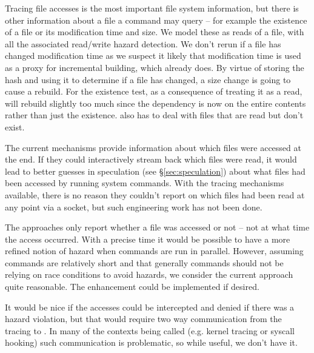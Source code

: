 Tracing file accesses is the most important file system information, but there is other information about a file a command may query -- for example the existence of a file or its modification time and size. We model these as reads of a file, with all the associated read/write hazard detection. %
We don't rerun if a file has changed modification time as we suspect it likely that modification time is used as a proxy for incremental building, which \Rattle already does. By virtue of \Rattle storing the hash and using it to determine if a file has changed, a size change is going to cause a rebuild. For the existence test, as a consequence of treating it as a read, \Rattle will rebuild slightly too much since the dependency is now on the entire contents rather than just the existence.  \Rattle also has to deal with files that are read but don't exist.



The current mechanisms provide information about which files were accessed at the end. If they could interactively stream back which files were read, it would lead to better guesses in speculation (see \S\ref{sec:speculation}) about what files had been accessed by running system commands. With the tracing mechanisms available, there is no reason they couldn't report on which files had been read at any point via a socket, but such engineering work has not been done.

The approaches only report whether a file was accessed or not -- not at what time the access occurred. With a precise time it would be possible to have a more refined notion of hazard when commands are run in parallel. However, assuming commands are relatively short and that generally commands should not be relying on race conditions to avoid hazards, we consider the current approach quite reasonable. The enhancement could be implemented if desired.

It would be nice if the accesses could be intercepted and denied if there was a hazard violation, but that would require two way communication from the tracing to \Rattle. In many of the contexts being called (e.g. kernel tracing or syscall hooking) such communication is problematic, so while useful, we don't have it.

